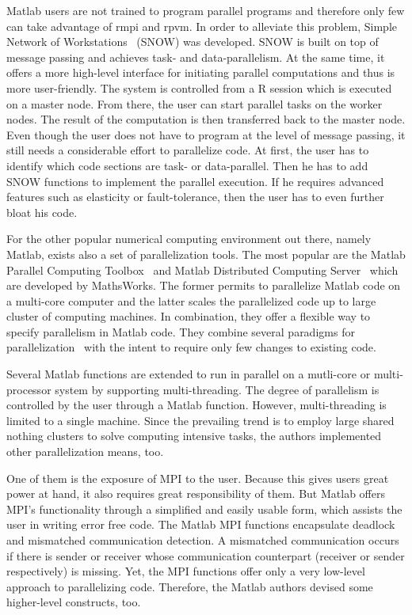 Matlab users are not trained to program parallel programs and therefore only few can take advantage of rmpi and rpvm.
In order to alleviate this problem, Simple Network of Workstations~\cite{tierney:pv0hros2008a} (SNOW) was developed.
SNOW is built on top of message passing and achieves task- and data-parallelism.
At the same time, it offers a more high-level interface for initiating parallel computations and thus is more user-friendly.
The system is controlled from a R session which is executed on a master node.
From there, the user can start parallel tasks on the worker nodes.
The result of the computation is then transferred back to the master node.
Even though the user does not have to program at the level of message passing, it still needs a considerable effort to parallelize code.
At first, the user has to identify which code sections are task- or data-parallel.
Then he has to add SNOW functions to implement the parallel execution.
If he requires advanced features such as elasticity or fault-tolerance, then the user has to even further bloat his code.

For the other popular numerical computing environment out there, namely Matlab, exists also a set of parallelization tools.
The most popular are the Matlab Parallel Computing Toolbox~\cite{parallelComputingToolbox} and Matlab Distributed Computing Server~\cite{distributedComputingServer} which are developed by MathsWorks.
The former permits to parallelize Matlab code on a multi-core computer and the latter scales the parallelized code up to large cluster of computing machines.
In combination, they offer a flexible way to specify parallelism in Matlab code.
They combine several paradigms for parallelization~\cite{sharma:ijpp2009a} with the intent to require only few changes to existing code.

Several Matlab functions are extended to run in parallel on a mutli-core or multi-processor system by supporting multi-threading.
The degree of parallelism is controlled by the user through a Matlab function.
However, multi-threading is limited to a single machine.
Since the prevailing trend is to employ large shared nothing clusters to solve computing intensive tasks, the authors implemented other parallelization means, too.

One of them is the exposure of MPI to the user.
Because this gives users great power at hand, it also requires great responsibility of them.
But Matlab offers MPI's functionality through a simplified and easily usable form, which assists the user in writing error free code.
The Matlab MPI functions encapsulate deadlock and mismatched communication detection.
A mismatched communication occurs if there is sender or receiver whose communication counterpart (receiver or sender respectively) is missing.
Yet, the MPI functions offer only a very low-level approach to parallelizing code.
Therefore, the Matlab authors devised some higher-level constructs, too.

